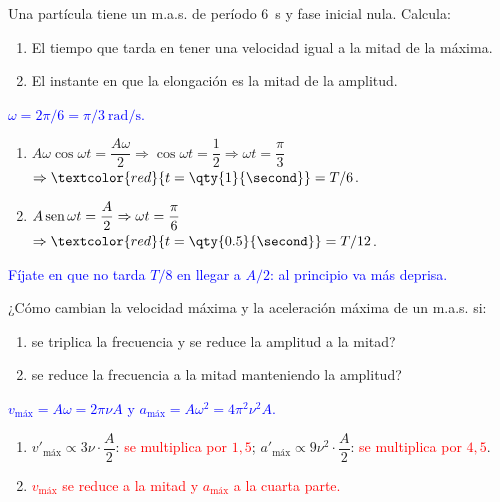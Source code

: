 \begin{exercise}
    Una partícula tiene un m.a.s. de período \qty{6}{\second} y fase inicial nula. Calcula:
    \begin{enumerate}[label=\letraminuscula]
        \item El tiempo que tarda en tener una velocidad igual a la mitad de la máxima.
        \item El instante en que la elongación es la mitad de la amplitud.
    \end{enumerate}
    \begin{solu}
        \textcolor{blue}{\(\omega = 2\pi/6 = \pi/3\ \unit{\radian\per\second}\).}
        \begin{enumerate}[label=\letraminuscula]
            \item \(A\omega\cos\omega t = \dfrac{A\omega}{2} \Rightarrow \cos\omega t = \dfrac{1}{2} \Rightarrow \omega t = \dfrac{\pi}{3}\)
            \(\Rightarrow \textcolor{red}{t = \qty{1}{\second}} = T/6\).
            \item \(A\operatorname{sen}\omega t = \dfrac{A}{2} \Rightarrow \omega t = \dfrac{\pi}{6}\) \(\Rightarrow \textcolor{red}{t = \qty{0.5}{\second}} = T/12\).
        \end{enumerate}
        \textcolor{blue}{Fíjate en que no tarda \(T/8\) en llegar a \(A/2\): al principio va más deprisa.}
    \end{solu}
\end{exercise}

\begin{exercise}
    ¿Cómo cambian la velocidad máxima y la aceleración máxima de un m.a.s. si:
    \begin{enumerate}[label=\letraminuscula]
        \item se triplica la frecuencia y se reduce la amplitud a la mitad?
        \item se reduce la frecuencia a la mitad manteniendo la amplitud?
    \end{enumerate}
    \begin{solu}
        \textcolor{blue}{\(v_{\text{máx}} = A\omega = 2\pi\nu A\) y \(a_{\text{máx}} = A\omega^2 = 4\pi^2\nu^2 A\).}
        \begin{enumerate}[label=\letraminuscula]
            \item \(v'_{\text{máx}} \propto 3\nu\cdot\dfrac{A}{2}\): \textcolor{red}{se multiplica por \(1{,}5\)}; \(a'_{\text{máx}} \propto 9\nu^2\cdot\dfrac{A}{2}\): \textcolor{red}{se multiplica por \(4{,}5\)}.
            \item \textcolor{red}{\(v_{\text{máx}}\) se reduce a la mitad y \(a_{\text{máx}}\) a la cuarta parte.}
        \end{enumerate}
    \end{solu}
\end{exercise}

